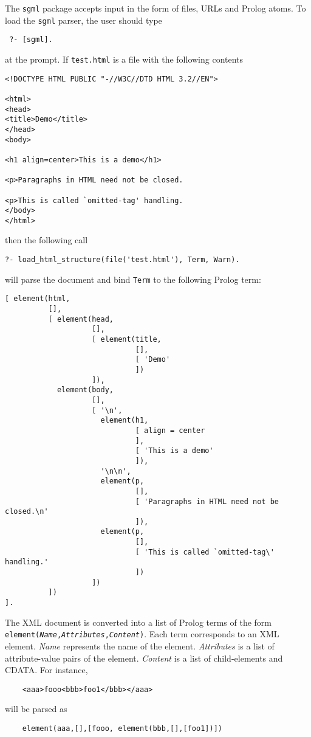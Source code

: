 The {\tt sgml} package accepts
input in the form of files, URLs and Prolog atoms.
To load the {\tt sgml} parser, the user should type
\begin{verbatim}
 ?- [sgml].  
\end{verbatim}
at the prompt.
If {\tt test.html} is a file with the following contents 
\begin{verbatim}
<!DOCTYPE HTML PUBLIC "-//W3C//DTD HTML 3.2//EN">

<html>
<head>
<title>Demo</title>
</head>
<body>

<h1 align=center>This is a demo</h1>

<p>Paragraphs in HTML need not be closed.

<p>This is called `omitted-tag' handling.
</body>
</html>
\end{verbatim}
then the following call
\begin{verbatim}
?- load_html_structure(file('test.html'), Term, Warn).
\end{verbatim}
will parse the document and bind {\tt Term} to the following Prolog term: 
\begin{verbatim}
[ element(html,
          [],
          [ element(head,
                    [],
                    [ element(title,
                              [],
                              [ 'Demo'
                              ])
                    ]),
            element(body,
                    [],
                    [ '\n',
                      element(h1,
                              [ align = center
                              ],
                              [ 'This is a demo'
                              ]),
                      '\n\n',
                      element(p,
                              [],
                              [ 'Paragraphs in HTML need not be closed.\n'
                              ]),
                      element(p,
                              [],
                              [ 'This is called `omitted-tag\' handling.'
                              ])
                    ])
          ])
].
\end{verbatim}



\noindent
The XML document is converted into a list of Prolog terms of the form {\tt
  element(\emph{Name},\emph{Attributes},\emph{Content})}.  Each term
corresponds to an XML element. \emph{Name} represents the name of the element.
\emph{Attributes} is a list of attribute-value pairs of the element.  
\emph{Content} is a list of child-elements and CDATA.
For instance, 
\begin{verbatim}
    <aaa>fooo<bbb>foo1</bbb></aaa>  
\end{verbatim}
will be parsed as
\begin{verbatim}
    element(aaa,[],[fooo, element(bbb,[],[foo1])])  
\end{verbatim}

